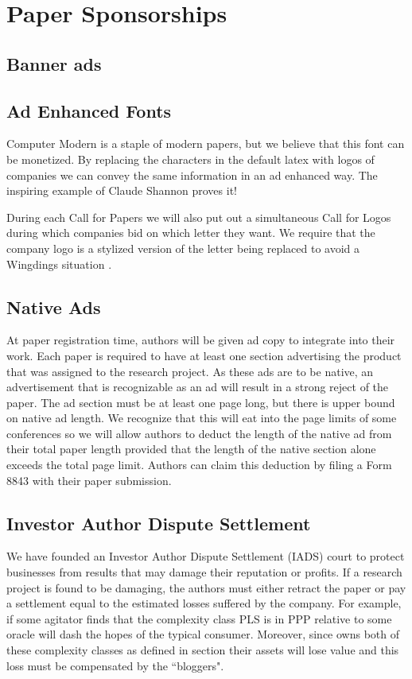 \section{Paper Sponsorships}

\subsection{Banner ads}

\subsection{Ad Enhanced Fonts}
Computer Modern is a staple of modern papers, but we believe that this font can
be monetized.
By replacing the characters in the default latex with logos of companies we can
convey the same information in an ad enhanced way. The inspiring example of Claude Shannon proves it!

During each Call for Papers we will also put out a simultaneous Call for
Logos during which companies bid on which letter they want.
We require that the company logo is a stylized version of the letter being
replaced to avoid a Wingdings situation .


\subsection{Native Ads}

At paper registration time, authors will be given ad copy to integrate into
their work.
Each paper is required to have at least one section advertising the product
that was assigned to the research project.
As these ads are to be native, an advertisement that is recognizable as an ad
will result in a strong reject of the paper.
The ad section must be at least one page long, but there is upper bound on
native ad length.
We recognize that this will eat into the page limits of some conferences so we
will allow authors to deduct the length of the native ad from their total paper
length provided that the length of the native section alone exceeds the total
page limit.
Authors can claim this deduction by filing a Form 8843 with their paper
submission.

\subsection{Investor Author Dispute Settlement}
We have founded an Investor Author Dispute Settlement (IADS) court to protect
businesses from results that may damage their reputation or profits.
If a research project is found to be damaging, the authors must either retract
the paper or pay a settlement equal to the estimated losses suffered by the
company.
For example, if some agitator finds that the complexity class PLS is in PPP
relative to some oracle will dash the hopes of the typical 
consumer.
Moreover, since  owns both of these complexity classes as defined
in section  their assets will lose value and
this loss must be compensated by the ``bloggers".


